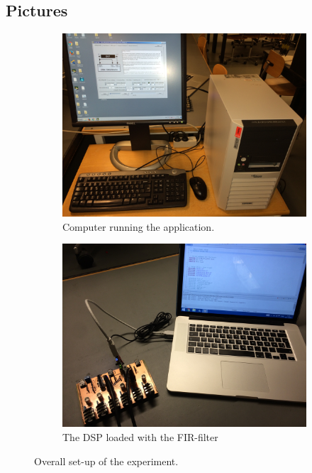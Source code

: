 \subsection{Pictures}
\begin{figure}[H]
	\centering
	\begin{subfigure}[b]{.495\textwidth}
		\centering
		\includegraphics[width=\textwidth]{../Journal/Experiments/Figures/Fullsetup1}
		\caption{Computer running the application.}
		\label{fig:FIRFullSetup1}
	\end{subfigure} 
	\begin{subfigure}[b]{.495\textwidth}
		\centering
		\includegraphics[width=\textwidth]{../Journal/Experiments/Figures/Fullsetup2}
		\caption{The DSP loaded with the FIR-filter}
		\label{fig:FIRFullSetup2}
	\end{subfigure}
	\caption{Overall set-up of the experiment.}
		\label{fig:FIRFullSetup}
\end{figure}


